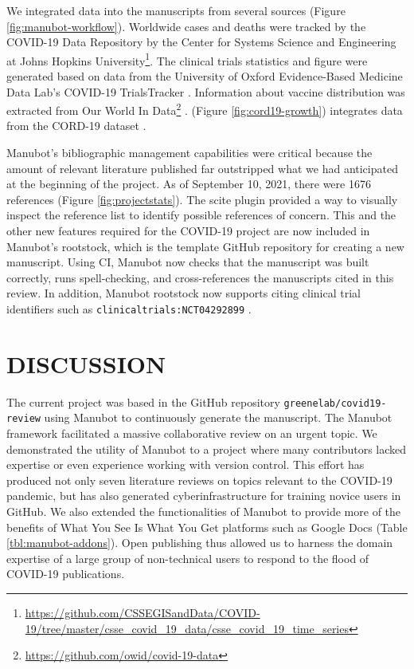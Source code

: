 \documentclass[twocolumn]{ceurart}
\begin{document}
We integrated data into the manuscripts from several sources (Figure \ref{fig:manubot-workflow}).
Worldwide cases and deaths were tracked by the COVID-19 Data Repository by the Center for Systems Science and Engineering at Johns Hopkins University\footnote{\url{https://github.com/CSSEGISandData/COVID-19/tree/master/csse_covid_19_data/csse_covid_19_time_series}}.
The clinical trials statistics and figure were generated based on data from the University of Oxford Evidence-Based Medicine Data Lab's COVID-19 TrialsTracker \citep{SSbnPnzT}.
Information about vaccine distribution was extracted from Our World In Data\footnote{\url{https://github.com/owid/covid-19-data}} \citep{ZHvhFakW}.
(Figure \ref{fig:cord19-growth}) integrates data from the CORD-19 dataset \citep{CiOwklc6}.

Manubot's bibliographic management capabilities were critical because the amount of relevant literature published far outstripped what we had anticipated at the beginning of the project.
As of September 10, 2021, there were 1676 references (Figure \ref{fig:projectstats}).
The scite plugin provided a way to visually inspect the reference list to identify possible references of concern.
This and the other new features required for the COVID-19 project are now included in Manubot's rootstock, which is the template GitHub repository for creating a new manuscript.
Using CI, Manubot now checks that the manuscript was built correctly, runs spell-checking, and cross-references the manuscripts cited in this review.
In addition, Manubot rootstock now supports citing clinical trial identifiers such as \texttt{clinicaltrials:NCT04292899} \citep{yTCAmOyt}.

\hypertarget{discussion}{%
\section{DISCUSSION}\label{discussion}}

The current project was based in the GitHub repository \texttt{greenelab/covid19-review} using Manubot \citep{YuJbg3zO} to continuously generate the manuscript.
The Manubot framework facilitated a massive collaborative review on an urgent topic.
We demonstrated the utility of Manubot to a project where many contributors lacked expertise or even experience working with version control.
This effort has produced not only seven literature reviews on topics relevant to the COVID-19 pandemic, but has also generated cyberinfrastructure for training novice users in GitHub.
We also extended the functionalities of Manubot to provide more of the benefits of What You See Is What You Get platforms such as Google Docs (Table \ref{tbl:manubot-addons}).
Open publishing thus allowed us to harness the domain expertise of a large group of non-technical users to respond to the flood of COVID-19 publications.
\end{document}
